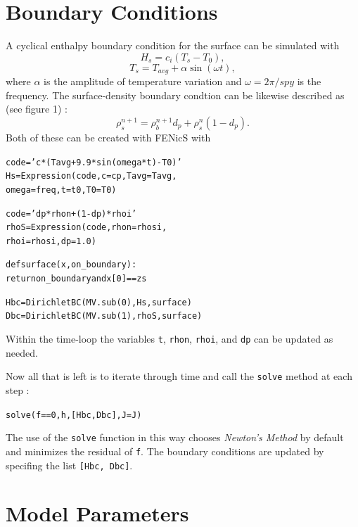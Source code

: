 \documentclass{article}%
\begin{document}
\section{Boundary Conditions}

A cyclical enthalpy boundary condition for the surface can be simulated with 
  $$
    H_s = c_i ( T_s - T_0 ),
  $$
  $$
    T_s = T_{avg} + \alpha \sin(\omega t),
  $$
where $\alpha$ is the amplitude of temperature variation and $\omega = 2\pi / spy$ is the frequency.  The surface-density boundary condtion can be likewise described as (see figure 1) : 
  $$
    \rho_s^{n+1} = \rho_b^{n+1} d_p + \rho_s^{n} (1 - d_p).
  $$
Both of these can be created with FENicS with
\footnotesize
\begin{alltt}
code = 'c*(Tavg + 9.9*sin(omega*t) - T0)'
Hs   = Expression(code, c=cp, Tavg=Tavg, 
                  omega=freq, t=t0, T0=T0)

code = 'dp*rhon + (1 - dp)*rhoi'
rhoS = Expression(code, rhon=rhosi, 
                  rhoi=rhosi, dp=1.0)

def surface(x, on_boundary):
  return on_boundary and x[0] == zs

Hbc  = DirichletBC(MV.sub(0), Hs, surface)
Dbc  = DirichletBC(MV.sub(1), rhoS, surface)
\end{alltt}
\normalsize
Within the time-loop the variables \texttt{t}, \texttt{rhon}, \texttt{rhoi}, and \texttt{dp} can be updated as needed.

Now all that is left is to iterate through time and call the \texttt{solve} method at each step :\par
\footnotesize
\begin{alltt}
solve(f == 0, h, [Hbc, Dbc], J=J)
\end{alltt}
\normalsize
The use of the \texttt{solve} function in this way chooses \emph{Newton's Method} by default and minimizes the residual of \texttt{f}.  The boundary conditions are updated by specifing the list \texttt{[Hbc, Dbc]}.


\section{Model Parameters}
\end{document}
